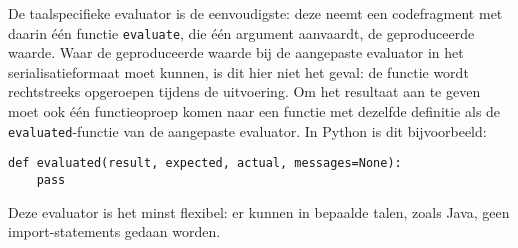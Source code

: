 De taalspecifieke evaluator is de eenvoudigste: deze neemt een codefragment met daarin één functie \texttt{evaluate}, die één argument aanvaardt, de geproduceerde waarde.
Waar de geproduceerde waarde bij de aangepaste evaluator in het serialisatieformaat moet kunnen, is dit hier niet het geval: de functie wordt rechtstreeks opgeroepen tijdens de uitvoering.
Om het resultaat aan te geven moet ook één functieoproep komen naar een functie met dezelfde definitie als de \texttt{evaluated}-functie van de aangepaste evaluator.
In Python is dit bijvoorbeeld:

\begin{verbatim}
def evaluated(result, expected, actual, messages=None):
    pass
\end{verbatim}

Deze evaluator is het minst flexibel: er kunnen in bepaalde talen, zoals Java, geen import-statements gedaan worden.
